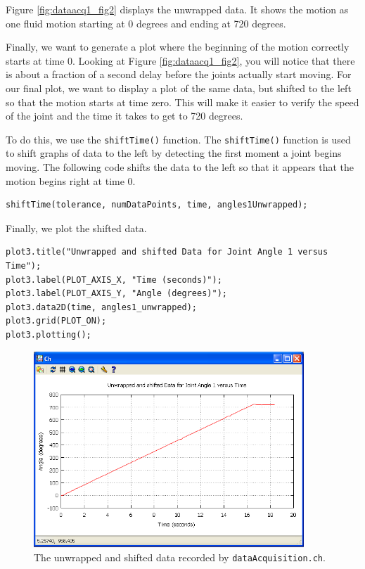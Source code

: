 \documentclass{article}
\begin{document}
Figure \ref{fig:dataacq1_fig2} displays the unwrapped data. It shows the motion as 
one fluid motion starting at 0 degrees and ending at 720 degrees. 

Finally, we want to generate a plot where the beginning of the motion correctly starts
at time 0. Looking at Figure \ref{fig:dataacq1_fig2}, you will notice that there is about
a fraction of a second delay before the joints actually start moving. For our final plot, we want
to display a plot of the same data, but shifted to the left so that the motion starts at
time zero. This will make it easier to verify the speed of the joint and the time it takes
to get to 720 degrees. 

To do this, we use the \texttt{shiftTime()} function. The \texttt{shiftTime()} function
is used to shift graphs of data to the left by detecting the first moment a joint begins
moving. The following code shifts the data to the left so that it appears that the motion begins
right at time 0.
\begin{verbatim}
shiftTime(tolerance, numDataPoints, time, angles1Unwrapped);
\end{verbatim}

Finally, we plot the shifted data.

\begin{verbatim}
plot3.title("Unwrapped and shifted Data for Joint Angle 1 versus Time");
plot3.label(PLOT_AXIS_X, "Time (seconds)");
plot3.label(PLOT_AXIS_Y, "Angle (degrees)");
plot3.data2D(time, angles1_unwrapped);
plot3.grid(PLOT_ON);
plot3.plotting();
\end{verbatim}

\begin{figure}[H]
\centering
\includegraphics[width=4in]{images/dataacq1_plot3.png}
\caption{\label{fig:dataacq1_fig3} The unwrapped and shifted data recorded by \texttt{dataAcquisition.ch}.}
\end{figure}
\end{document}
